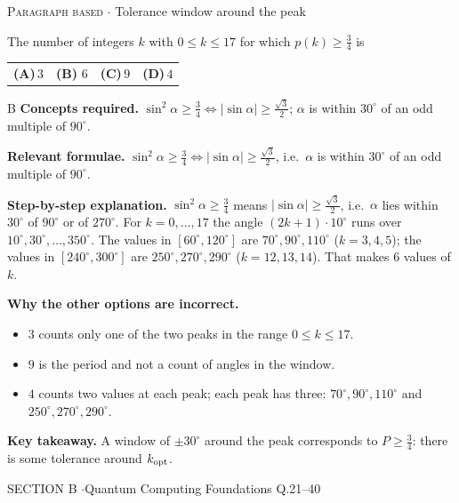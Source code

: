 \documentclass[11pt,a4paper]{article}
\newcommand{\optlabel}[1]{\textbf{(#1)}}
\newcommand{\correctlabel}[1]{\textcolor{okgreen}{\textbf{(#1)}\,\ding{51}}}
\newenvironment{qitem}[1]{\begin{list}{}{\setlength{\leftmargin}{3.3em}\setlength{\labelwidth}{3.1em}%
  \setlength{\labelsep}{0.2em}\setlength{\topsep}{3pt}\setlength{\parsep}{3pt}}\item[\textbf{Q.#1}\hfill]}{\end{list}}
\newcommand{\qsep}{\par\vspace{2pt}{\color{black!15}\hrule}\vspace{4pt}}
\newcommand{\qmeta}[2]{{\footnotesize\color{black!60}\textsc{#1} \;$\cdot$\; #2}\par}
\begin{document}
\begin{qitem}{20}
\qmeta{Paragraph based}{Tolerance window around the peak}
The number of integers $k$ with $0 \le k \le 17$ for which $p(k) \ge \tfrac34$ is
\par\smallskip\noindent\begin{tabularx}{\linewidth}{@{}*{4}{L}@{}}
\optlabel{A}\,$3$ & \correctlabel{B}\,$6$ & \optlabel{C}\,$9$ & \optlabel{D}\,$4$
\end{tabularx}
\end{qitem}
\begin{solbox}{B}
\textbf{\color{brand}Concepts required.} $\sin^2\alpha \ge \frac34 \iff |\sin\alpha| \ge \frac{\sqrt3}{2}$; $\alpha$ is within $30^\circ$ of an odd multiple of $90^\circ$.

\textbf{\color{brand}Relevant formulae.} $\sin^2\alpha \ge \frac34 \iff |\sin\alpha| \ge \frac{\sqrt3}{2}$, i.e.\ $\alpha$ is within $30^\circ$ of an odd multiple of $90^\circ$.

\textbf{\color{brand}Step-by-step explanation.} $\sin^2\alpha \ge \frac34$ means $|\sin\alpha| \ge \frac{\sqrt3}{2}$, i.e.\ $\alpha$ lies within $30^\circ$ of $90^\circ$ or of $270^\circ$. For $k = 0, \dots, 17$ the angle
$(2k+1)\cdot10^\circ$ runs over $10^\circ, 30^\circ, \dots, 350^\circ$. The values in $[60^\circ, 120^\circ]$ are $70^\circ, 90^\circ, 110^\circ$ ($k = 3, 4, 5$);
the values in $[240^\circ, 300^\circ]$ are $250^\circ, 270^\circ, 290^\circ$ ($k = 12, 13, 14$). That makes $6$ values of $k$.

\textbf{\color{brand}Why the other options are incorrect.}
\begin{itemize}[leftmargin=2.4em, itemsep=1pt, topsep=2pt]
\item[\textbf{(A)}] $3$ counts only one of the two peaks in the range $0 \le k \le 17$.
\item[\textbf{(C)}] $9$ is the period and not a count of angles in the window.
\item[\textbf{(D)}] $4$ counts two values at each peak; each peak has three: $70^\circ, 90^\circ, 110^\circ$ and $250^\circ, 270^\circ, 290^\circ$.
\end{itemize}
\textbf{\color{brand}Key takeaway.} A window of $\pm30^\circ$ around the peak corresponds to $P \ge \frac34$: there is some tolerance around $k_{\rm opt}$.
\end{solbox}
\qsep

\newpage

\begin{sectionbanner}SECTION B \enspace$\cdot$\enspace Quantum Computing Foundations \hfill Q.21--40\end{sectionbanner}
\end{document}
